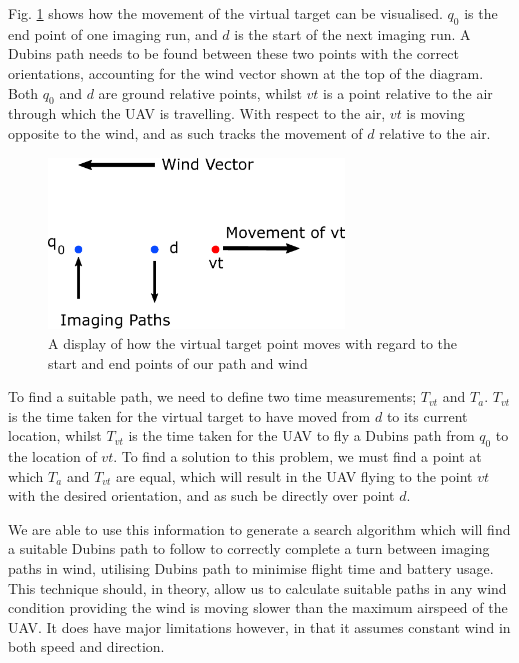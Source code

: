 Fig. \ref{fig:windalgorithm} shows how the movement of the virtual target can be visualised. $q_0$ is the end point of one imaging run, and $d$ is the start of the next imaging run. A Dubins path needs to be found between these two points with the correct orientations, accounting for the wind vector shown at the top of the diagram. Both $q_0$ and $d$ are ground relative points, whilst $vt$ is a point relative to the air through which the UAV is travelling. With respect to the air, $vt$ is moving opposite to the wind, and as such tracks the movement of $d$ relative to the air.
\vspace{1cm}
\begin{figure}[htbp!] 
\centering    
\includegraphics[width=0.7\textwidth]{WindAlgorithm}
\caption[Calculating the movement of a virtual target due to wind]{A display of how the virtual target point moves with regard to the start and end points of our path and wind}
\label{fig:windalgorithm}
\end{figure}

To find a suitable path, we need to define two time measurements; $T_{vt}$ and $T_a$. $T_{vt}$ is the time taken for the virtual target to have moved from $d$ to its current location, whilst $T_{vt}$ is the time taken for the UAV to fly a Dubins path from $q_0$ to the location of $vt$. To find a solution to this problem, we must find a point at which $T_a$ and $T_{vt}$ are equal, which will result in the UAV flying to the point $vt$ with the desired orientation, and as such be directly over point $d$. 

We are able to use this information to generate a search algorithm which will find a suitable Dubins path to follow to correctly complete a turn between imaging paths in wind, utilising Dubins path to minimise flight time and battery usage. This technique should, in theory, allow us to calculate suitable paths in any wind condition providing the wind is moving slower than the maximum airspeed of the UAV. It does have major limitations however, in that it assumes constant wind in both speed and direction. %

